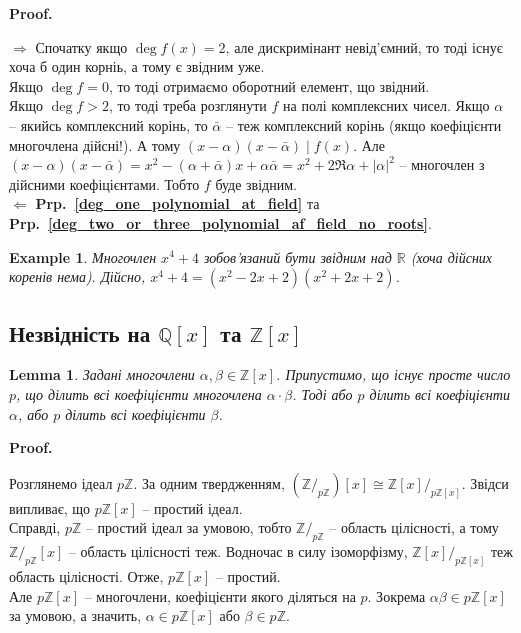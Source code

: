 \documentclass[a4paper, 10pt]{article}
\makeatletter
\def\rightproof{$\boxed{\Rightarrow}$ }
\def\leftproof{$\boxed{\Leftarrow}$ }
\theoremstyle{theoremdd}
\theoremstyle{theoremdd}
\theoremstyle{theoremdd}
\theoremstyle{theoremdd}
\theoremstyle{theoremdd}
\newtheorem{example}[theorem]{Example}
\theoremstyle{theoremdd}
\theoremstyle{theoremdd}
\theoremstyle{theoremdd}
\theoremstyle{theoremdd}
\theoremstyle{theoremdd}
\theoremstyle{theoremdd}
\theoremstyle{theoremdd}
\theoremstyle{theoremdd}
\newtheorem{lemma}[theorem]{Lemma}
\theoremstyle{theoremdd}
\theoremstyle{theoremdd}
\renewenvironment{proof}[1][Proof.\\]{\par
\pushQED{\hfill \qed}%
\normalfont \topsep6\p@\@plus6\p@\relax
\trivlist
\item\relax
{\bfseries
#1\@addpunct{.}}\hspace\labelsep\ignorespaces
}{%
\popQED\endtrivlist\@endpefalse
}
\newcommand\prpref[1]{\textbf{Prp.~\ref{#1}}}
\makeatother
\begin{document}
\begin{proof}
\rightproof Спочатку якщо $\deg f(x) = 2$, але дискримінант невід'ємний, то тоді існує хоча б один корніь, а тому є звідним уже.\\
Якщо $\deg f = 0$, то тоді отримаємо оборотний елемент, що звідний.\\
Якщо $\deg f > 2$, то тоді треба розглянути $f$ на полі комплексних чисел. Якщо $\alpha$ -- якийсь комплексний корінь, то $\bar{\alpha}$ -- теж комплексний корінь (якщо коефіцієнти многочлена дійсні!). А тому $(x-\alpha)(x-\bar{\alpha}) \mid f(x)$. Але $(x-\alpha)(x-\bar{\alpha}) = x^2 - (\alpha + \bar{\alpha}) x + \alpha \bar{\alpha} = x^2 + 2 \Re \alpha + |\alpha|^2$ -- многочлен з дійсними коефіцієнтами. Тобто $f$ буде звідним.
\bigskip \\
\leftproof \prpref{deg_one_polynomial_at_field} та \prpref{deg_two_or_three_polynomial_af_field_no_roots}.
\end{proof}

\begin{example}
Многочлен $x^4 + 4$ зобов'язаний бути звідним над $\mathbb{R}$ (хоча дійсних коренів нема). Дійсно, $x^4 + 4 = (x^2-2x+2)(x^2+2x+2)$.
\end{example}

\subsection{Незвідність на $\mathbb{Q}[x]$ та $\mathbb{Z}[x]$}
\begin{lemma}
Задані многочлени $\alpha,\beta \in \mathbb{Z}[x]$. Припустимо, що існує просте число $p$, що ділить всі коефіцієнти многочлена $\alpha \cdot \beta$. Тоді або $p$ ділить всі коефіцієнти $\alpha$, або $p$ ділить всі коефіцієнти $\beta$.
\end{lemma}

\begin{proof}
Розглянемо ідеал $p \mathbb{Z}$. За одним твердженням, $(\mathbb{Z}/_{p \mathbb{Z}})[x] \cong \mathbb{Z}[x]/_{p \mathbb{Z}[x]}$. Звідси випливає, що $p \mathbb{Z}[x]$ -- простий ідеал.\\
Справді, $p \mathbb{Z}$ -- простий ідеал за умовою, тобто $\mathbb{Z}/_{p \mathbb{Z}}$ -- область цілісності, а тому $\mathbb{Z}/_{p \mathbb{Z}}[x]$ -- область цілісності теж. Водночас в силу ізоморфізму, $\mathbb{Z}[x]/_{p \mathbb{Z}[x]}$ теж область цілісності. Отже, $p \mathbb{Z}[x]$ -- простий.\\
Але $p \mathbb{Z}[x]$ -- многочлени, коефіцієнти якого діляться на $p$. Зокрема $\alpha \beta \in p \mathbb{Z}[x]$ за умовою, а значить, $\alpha \in p \mathbb{Z}[x]$ або $\beta \in p \mathbb{Z}$.
\end{proof}
\end{document}
